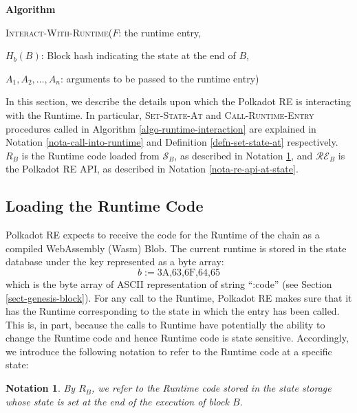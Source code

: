 \documentclass{book}
\newcommand{\assign}{:=}
\newcommand{\tmname}[1]{\textsc{#1}}
\newcommand{\tmtextbf}[1]{{\bfseries{#1}}}
\newcommand{\tmtextsc}[1]{{\scshape{#1}}}
\newcommand{\tmtextup}[1]{{\upshape{#1}}}
\newenvironment{tmindent}{\begin{tmparmod}{1.5em}{0pt}{0pt}}{\end{tmparmod}}
\newenvironment{tmparmod}[3]{\begin{list}{}{\setlength{\topsep}{0pt}\setlength{\leftmargin}{#1}\setlength{\rightmargin}{#2}\setlength{\parindent}{#3}\setlength{\listparindent}{\parindent}\setlength{\itemindent}{\parindent}\setlength{\parsep}{\parskip}} \item[]}{\end{list}}
\newenvironment{tmparsep}[1]{\begingroup\setlength{\parskip}{#1}}{\endgroup}
\newcounter{tmcounter}
\newcommand{\custombinding}[1]{%
  \setcounter{tmcounter}{#1}%
  \addtocounter{tmcounter}{-1}%
  \refstepcounter{tmcounter}}
\newtheorem{notation}{Notation}
\providecommand{\tmname}[1]{\tmtextsc{#1}}
\providecommand{\tmtextbf}[1]{\tmtextbf{#1}}
\newtheorem{notation}{Notation}
\begin{document}
\custombinding{3}{\noindent}\begin{tmparmod}{0pt}{0pt}{0em}%
  \begin{tmparsep}{0em}%
    \tmtextbf{Algorithm \tmtextup{3}}{\smallskip}
    
    \begin{tmindent}
      \label{algo-runtime-interaction}{\tmname{Interact-With-Runtime}}($F$:
      the runtime entry,
      
      $H_b (B)$: Block hash indicating the state at the end of $B$,
      
      $A_1, A_2, \ldots, A_n$: arguments to be passed to the runtime entry)
    \end{tmindent}
  \end{tmparsep}
\end{tmparmod}{\medskip}

In this section, we describe the details upon which the Polkadot RE is
interacting with the Runtime. In particular, {\tmname{Set-State-At}} and
{\tmname{Call-Runtime-Entry}} procedures called in Algorithm
\ref{algo-runtime-interaction} are explained in Notation
\ref{nota-call-into-runtime} and Definition \ref{defn-set-state-at}
respectively. $R_B$ is the Runtime code loaded from $\mathcal{S}_B$, as
described in Notation \ref{nota-runtime-code-at-state}, and
$\mathcal{R}\mathcal{E}_B$ is the Polkadot RE API, as described in Notation
\ref{nota-re-api-at-state}.

\subsection{Loading the Runtime Code \ \ }\label{sect-loading-runtime-code}

Polkadot RE expects to receive the code for the Runtime of the chain as a
compiled WebAssembly (Wasm) Blob. The current runtime is stored in the state
database under the key represented as a byte array:
\[ b \assign \text{3A,63,6F,64,65} \]
which is the byte array of ASCII representation of string ``:code'' (see
Section \ref{sect-genesis-block}). For any call to the Runtime, Polkadot RE
makes sure that it has the Runtime corresponding to the state in which the
entry has been called. This is, in part, because the calls to Runtime have
potentially the ability to change the Runtime code and hence Runtime code is
state sensitive. Accordingly, we introduce the following notation to refer to
the Runtime code at a specific state:

\begin{notation}
  \label{nota-runtime-code-at-state}By $R_B$, we refer to the Runtime code
  stored in the state storage whose state is set at the end of the execution
  of block $B$.
\end{notation}
\end{document}
